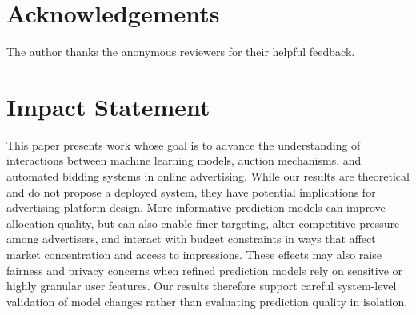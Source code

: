 \documentclass{article}
\theoremstyle{plain}
\theoremstyle{definition}
\theoremstyle{remark}
\begin{document}










\newpage
\section*{Acknowledgements}
The author thanks the anonymous reviewers for their helpful feedback.

\section*{Impact Statement}
This paper presents work whose goal is to advance the understanding of interactions between machine learning models, auction mechanisms, and automated bidding systems in online advertising. While our results are theoretical and do not propose a deployed system, they have potential implications for advertising platform design. More informative prediction models can improve allocation quality, but can also enable finer targeting, alter competitive pressure among advertisers, and interact with budget constraints in ways that affect market concentration and access to impressions. These effects may also raise fairness and privacy concerns when refined prediction models rely on sensitive or highly granular user features. Our results therefore support careful system-level validation of model changes rather than evaluating prediction quality in isolation.
\end{document}
